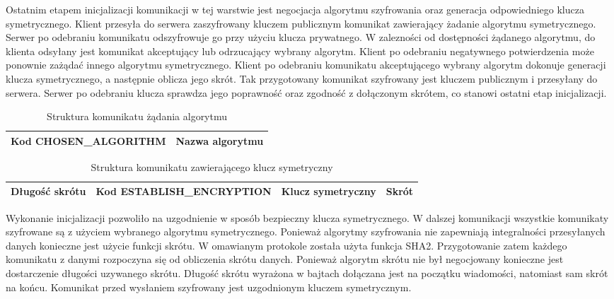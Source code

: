 Ostatnim etapem inicjalizacji komunikacji w tej warstwie jest
negocjacja algorytmu szyfrowania oraz generacja odpowiedniego klucza
symetrycznego. Klient przesyła do serwera zaszyfrowany kluczem
publicznym komunikat zawierający żadanie algorytmu
symetrycznego. Serwer po odebraniu komunikatu odszyfrowuje go przy
użyciu klucza prywatnego. W zalezności od dostępności żądanego
algorytmu, do klienta odsyłany jest komunikat akceptujący lub
odrzucający wybrany algorytm. Klient po odebraniu negatywnego
potwierdzenia może ponownie zażądać innego algorytmu
symetrycznego. Klient po odebraniu komunikatu akceptującego wybrany
algorytm dokonuje generacji klucza symetrycznego, a następnie oblicza
jego skrót. Tak przygotowany komunikat szyfrowany jest kluczem
publicznym i przesyłany do serwera. Serwer po odebraniu klucza
sprawdza jego poprawność oraz zgodność z dołączonym skrótem, co
stanowi ostatni etap inicjalizacji.

\begin{table}[H]
\centering
\caption{Struktura komunikatu żądania algorytmu }

\begin{tabular}{|p{5cm}|p{6cm}|}
\hline
\raggedright{Kod CHOSEN\_ALGORITHM} & Nazwa algorytmu\\
\hline
\end{tabular}
\end{table}

\begin{table}[H]
\centering
\caption{Struktura komunikatu zawierającego klucz symetryczny}

\begin{tabular}{|p{3cm}|p{5cm}|p{3cm}|p{2cm}|}
\hline
Długość skrótu & \raggedright{Kod ESTABLISH\_ENCRYPTION} & \raggedright{Klucz symetryczny} & Skrót \\
\hline
\end{tabular}
\end{table}

Wykonanie inicjalizacji pozwoliło na uzgodnienie w sposób bezpieczny
klucza symetrycznego. W dalszej komunikacji wszystkie komunikaty
szyfrowane są z użyciem wybranego algorytmu symetrycznego. Ponieważ
algorytmy szyfrowania nie zapewniają integralności przesyłanych danych
konieczne jest użycie funkcji skrótu. W omawianym protokole została
użyta funkcja SHA2. Przygotowanie zatem każdego komunikatu z danymi
rozpoczyna się od obliczenia skrótu danych. Ponieważ algorytm skrótu
nie był negocjowany konieczne jest dostarczenie długości uzywanego
skrótu. Długość skrótu wyrażona w bajtach dołączana jest na początku
wiadomości, natomiast sam skrót na końcu. Komunikat przed wysłaniem
szyfrowany jest uzgodnionym kluczem symetrycznym.


